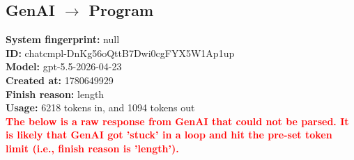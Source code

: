 \documentclass{article}
\begin{document}
\subsection*{GenAI $\rightarrow$ Program}
\textbf{System fingerprint: }null
\\\textbf{ID: }chatcmpl-DnKg56oQttB7Dwi0cgFYX5W1Ap1up
\\\textbf{Model: }gpt-5.5-2026-04-23
\\\textbf{Created at: }1780649929
\\\textbf{Finish reason: }length
\\\textbf{Usage: }6218 tokens in, and 1094 tokens out
\\\textcolor{red}{\textbf{The below is a raw response from GenAI that could not be parsed. It is likely that GenAI got 'stuck' in a loop and hit the pre-set token limit (i.e., finish reason is 'length').}}
\begin{lstlisting}

\end{lstlisting}
\end{document}
